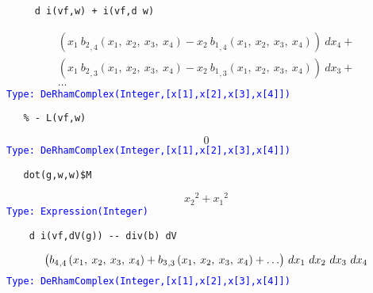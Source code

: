 \documentclass[12pt,a4paper]{article}
\newcommand{\type}[1]{\textcolor{blue}{\tt\tiny #1}}
\begin{document}
\begin{lstlisting}
     d i(vf,w) + i(vf,d w)
\end{lstlisting}
\begin{eqnarray*}
    {{\left( {{x _ {1}} \  {{{b _ {2}} _ {{,4}}} 
    \left({{x _ {1}}, \: {x _ {2}}, \: {x _ {3}}, \: {x _ {4}}} 
    \right)}}-{{x _ {2}} \  {{{b _ {1}} _ {{,4}}} 
    \left({{x _ {1}}, \: {x _ {2}}, \: {x _ {3}}, \: {x _ {4}}} 
    \right)}}\right)}
    \  {dx _ {4}}}+ \\ {{\left( {{x _ {1}} \  {{{b _ {2}} _ {{,3}}} 
    \left({{x _ {1}}, \: {x _ {2}}, \: {x _ {3}}, \: {x _ {4}}} 
    \right)}}-{{x _ {2}} \  {{{b _ {1}} _ {{,3}}} 
    \left({{x _ {1}}, \: {x _ {2}}, \: {x _ {3}}, \: {x _ {4}}} 
    \right)}}\right)}
    \  {dx _ {3}}}+ \\ \ldots 
\end{eqnarray*}
\type{Type: DeRhamComplex(Integer,[x[1],x[2],x[3],x[4]])}
\begin{lstlisting}
   % - L(vf,w)
\end{lstlisting}
\begin{displaymath}
   0
\end{displaymath}    
\type{Type: DeRhamComplex(Integer,[x[1],x[2],x[3],x[4]])}
\begin{lstlisting}
   dot(g,w,w)$M
\end{lstlisting}
\begin{displaymath}
   {{{x _ {2}}} ^ {2}}+{{{x _ {1}}} ^ {2}} 
\end{displaymath}    
\type{Type: Expression(Integer)}
\begin{lstlisting}
    d i(vf,dV(g)) -- div(b) dV
\end{lstlisting}
\begin{eqnarray*}
   \def\sp{^}\def\sb{_}\def\leqno(#1){}
    \def\erf{\mathrm{erf}}\def\sinh{\mathrm{sinh}}
    \def\zag#1#2{{{\left.{#1}\right|}\over{\left|{#2}\right.}}}
    \def\csch{\mathrm{csch}}
    {\left( {{{b \sb {4}} \sb {{,4}}} 
    \left(
    {{x \sb {1}}, \: {x \sb {2}}, \: {x \sb {3}}, \: {x \sb {4}}} 
    \right)}+{{b
    \sb {3}} \sb {{,3}}} 
    \left(
    {{x \sb {1}}, \: {x \sb {2}}, \: {x \sb {3}}, \: {x \sb {4}}} 
    \right) + \ldots \right)}
    \  dx \sb {1} \  dx \sb {2} \  dx \sb {3} \  dx \sb {4}   
\end{eqnarray*}
\type{Type: DeRhamComplex(Integer,[x[1],x[2],x[3],x[4]])}
\end{document}
